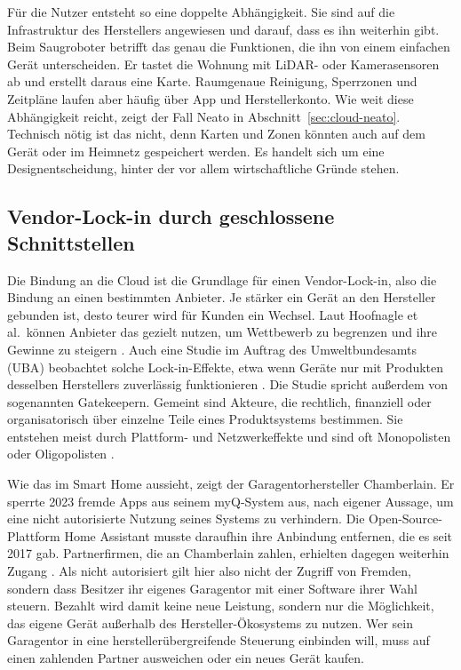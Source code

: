Für die Nutzer entsteht so eine doppelte Abhängigkeit. Sie sind auf die
Infrastruktur des Herstellers angewiesen und darauf, dass es ihn weiterhin
gibt. Beim Saugroboter betrifft das genau die Funktionen, die ihn von einem
einfachen Gerät unterscheiden. Er tastet die Wohnung mit LiDAR- oder
Kamerasensoren ab und erstellt daraus eine Karte. Raumgenaue Reinigung,
Sperrzonen und Zeitpläne laufen aber häufig über App und Herstellerkonto. Wie
weit diese Abhängigkeit reicht, zeigt der Fall Neato in
Abschnitt~\ref{sec:cloud-neato}. Technisch nötig ist das nicht, denn Karten und
Zonen könnten auch auf dem Gerät oder im Heimnetz gespeichert werden. Es
handelt sich um eine Designentscheidung, hinter der vor allem wirtschaftliche
Gründe stehen.

\subsection{Vendor-Lock-in durch geschlossene Schnittstellen}\label{sec:cloud-lockin}

Die Bindung an die Cloud ist die Grundlage für einen Vendor-Lock-in, also die
Bindung an einen bestimmten Anbieter. Je stärker ein Gerät an den Hersteller
gebunden ist, desto teurer wird für Kunden ein Wechsel. Laut Hoofnagle et al.\
können Anbieter das gezielt nutzen, um Wettbewerb zu begrenzen und ihre Gewinne
zu steigern \cite[S.~787, 809, 839\,ff.]{hoofnagle:2019}. Auch eine Studie im
Auftrag des Umweltbundesamts (\acrshort{UBA}) beobachtet solche
Lock-in-Effekte, etwa wenn Geräte nur mit Produkten desselben Herstellers
zuverlässig funktionieren \cite[S.~16]{jaegererben:2023}. Die Studie spricht
außerdem von sogenannten Gatekeepern. Gemeint sind Akteure, die rechtlich,
finanziell oder organisatorisch über einzelne Teile eines Produktsystems
bestimmen. Sie entstehen meist durch Plattform- und Netzwerkeffekte und sind
oft Monopolisten oder Oligopolisten \cite[S.~55]{jaegererben:2023}.

Wie das im Smart Home aussieht, zeigt der Garagentorhersteller Chamberlain. Er
sperrte 2023 fremde Apps aus seinem myQ-System aus, nach eigener Aussage, um
eine nicht autorisierte Nutzung seines Systems zu verhindern. Die
Open-Source-Plattform Home Assistant musste daraufhin ihre Anbindung entfernen,
die es seit 2017 gab. Partnerfirmen, die an Chamberlain zahlen, erhielten
dagegen weiterhin Zugang \cite{homeassistant:2023}. Als nicht autorisiert gilt
hier also nicht der Zugriff von Fremden, sondern dass Besitzer ihr eigenes
Garagentor mit einer Software ihrer Wahl steuern. Bezahlt wird damit keine neue
Leistung, sondern nur die Möglichkeit, das eigene Gerät außerhalb des
Hersteller-Ökosystems zu nutzen. Wer sein Garagentor in eine
herstellerübergreifende Steuerung einbinden will, muss auf einen zahlenden
Partner ausweichen oder ein neues Gerät kaufen.

